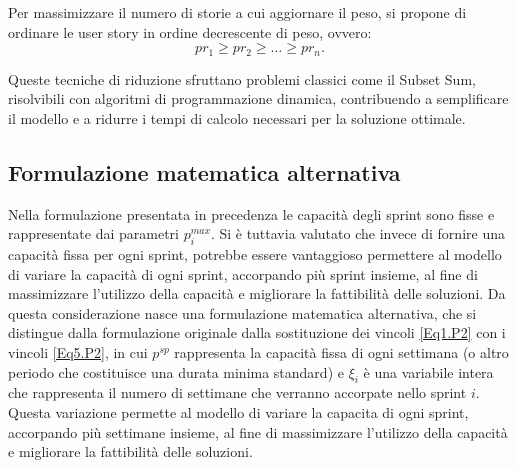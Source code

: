\documentclass[12pt,a4paper,openright,twoside]{book}
\begin{document}
Per massimizzare il numero di storie a cui aggiornare il peso, si propone di ordinare le user story in ordine decrescente di peso, ovvero:
\[
pr_1 \geq pr_2 \geq \dots \geq pr_n.
\]

Queste tecniche di riduzione sfruttano problemi classici come il Subset Sum, risolvibili con algoritmi di programmazione dinamica, contribuendo a semplificare il modello e a ridurre i tempi di calcolo necessari per la soluzione ottimale.


\subsection{Formulazione matematica alternativa}\label{sec.formulazione2}

Nella formulazione presentata in precedenza le capacità degli sprint sono fisse e rappresentate dai parametri \( p_i^{max} \). Si è tuttavia valutato che invece di fornire una capacità fissa per ogni sprint, potrebbe essere vantaggioso permettere al modello di variare la capacità di ogni sprint, accorpando più sprint insieme, al fine di massimizzare l'utilizzo della capacità e migliorare la fattibilità delle soluzioni.
Da questa considerazione nasce una formulazione matematica alternativa, che si distingue dalla formulazione originale dalla sostituzione dei vincoli \eqref{Eq1.P2} con i vincoli \eqref{Eq5.P2}, in cui $ p^{sp}$ rappresenta la capacità fissa di ogni settimana (o altro periodo che costituisce una durata minima standard) e $\xi_i$ è una variabile intera che rappresenta il numero di settimane che verranno accorpate nello sprint $i$.
Questa variazione permette al modello di variare la capacita di ogni sprint, accorpando più settimane insieme, al fine di massimizzare l'utilizzo della capacità e migliorare la fattibilità delle soluzioni.
\end{document}
